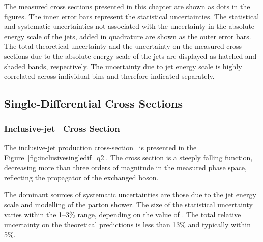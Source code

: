 The measured cross sections presented in this chapter are shown as dots in the figures. The inner error bars represent the statistical uncertainties. The statistical and systematic uncertainties not associated with the uncertainty in the absolute energy scale of the jets, added in quadrature are shown as the outer error bars. The total theoretical uncertainty and the uncertainty on the measured cross sections due to the absolute energy scale of the jets are displayed as hatched and shaded bands, respectively. The uncertainty due to jet energy scale is highly correlated across individual bins and therefore indicated separately.

\subsection{Single-Differential Cross Sections}
\subsubsection*{Inclusive-jet \dsdqsq~Cross Section}
The inclusive-jet production cross-section \dsdqsq~is presented in the Figure~\ref{fig:inclusivesingledif_q2}. The cross section is a steeply falling function, decreasing more than three orders of magnitude in the measured phase space, reflecting the propagator of the exchanged boson.

The dominant sources of systematic uncertainties are those due to the jet energy scale and modelling of the parton shower. The size of the statistical uncertainty varies within the 1--3\% range, depending on the value of \qsq. %
The total relative uncertainty on the theoretical predictions is less than 13\% and typically within 5\%. %

